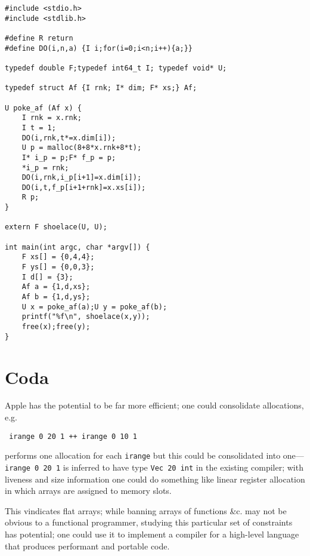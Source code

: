 \documentclass[acmsmall,screen,anonymous,nonacm]{acmart}
\begin{document}
\begin{verbatim}
#include <stdio.h>
#include <stdlib.h>

#define R return
#define DO(i,n,a) {I i;for(i=0;i<n;i++){a;}}

typedef double F;typedef int64_t I; typedef void* U;

typedef struct Af {I rnk; I* dim; F* xs;} Af;

U poke_af (Af x) {
    I rnk = x.rnk;
    I t = 1;
    DO(i,rnk,t*=x.dim[i]);
    U p = malloc(8+8*x.rnk+8*t);
    I* i_p = p;F* f_p = p;
    *i_p = rnk;
    DO(i,rnk,i_p[i+1]=x.dim[i]);
    DO(i,t,f_p[i+1+rnk]=x.xs[i]);
    R p;
}

extern F shoelace(U, U);

int main(int argc, char *argv[]) {
    F xs[] = {0,4,4};
    F ys[] = {0,0,3};
    I d[] = {3};
    Af a = {1,d,xs};
    Af b = {1,d,ys};
    U x = poke_af(a);U y = poke_af(b);
    printf("%f\n", shoelace(x,y));
    free(x);free(y);
}
\end{verbatim}

\section{Coda}

Apple has the potential to be far more efficient; one could consolidate allocations, e.g.

\begin{verbatim}
 irange 0 20 1 ++ irange 0 10 1
\end{verbatim}
performs one allocation for each {\tt irange} but this could be consolidated into one---{\tt irange 0 20 1} is inferred to have type {\tt Vec 20 int} in the existing compiler; with liveness and size information one could do something like linear register allocation in which arrays are assigned to memory slots.

This vindicates flat arrays; while banning arrays of functions \&c. may not be obvious to a functional programmer, studying this particular set of constraints has potential; one could use it to implement a compiler for a high-level language that produces performant and portable code.



\end{document}
